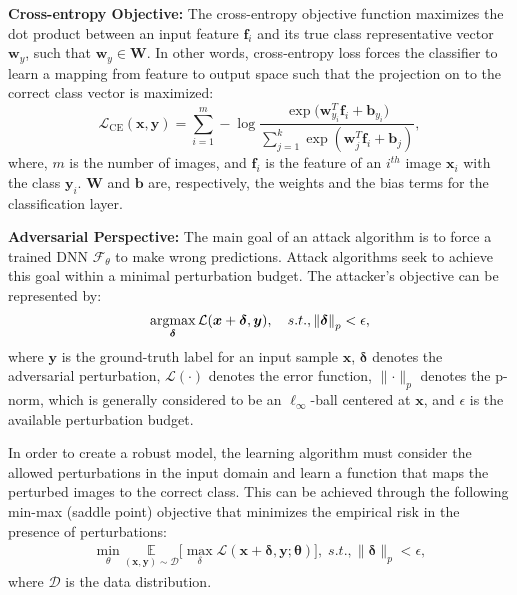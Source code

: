 \documentclass[10pt,twocolumn,letterpaper]{article}
\newcommand{\bx}{{\bm x}}
\newcommand{\bdelta}{{\bm \delta}}
\begin{document}
\noindent \textbf{Cross-entropy Objective:}  The cross-entropy objective function maximizes the dot product between an input feature $\bm{f}_i$ and its true class representative vector $\bm{w}_y$, such that $\bm{w}_y \in \bm{W}$. In other words, cross-entropy loss forces the classifier to learn a mapping from feature to output space such that the projection on to the correct class vector is maximized:\vspace{-0.55em}
\begin{equation}
\label{eq:2}
\mathcal{L}_{\text{CE}}(\bm{x}, \bm{y})= \sum_{i=1}^m - \log\frac{\exp({\bm{w}^T_{y_i}\bm{f}_i + \bm{b}_{y_i}) }}{\sum_{j=1}^k \exp({\bm{w}^T_{j}\bm{f}_i + \bm{b}_{j}}) },
\end{equation}
where, $m$ is the number of images, and $\bm{f}_i$ is the feature of an $i^{th}$ image $\bm{x}_i$ with the class $\bm{y}_i$. $\bm{W}$ and $\bm{b}$ are, respectively, the weights and the bias terms for the classification layer.

\noindent \textbf{Adversarial Perspective:} The main goal of an attack algorithm is to force a trained DNN $\mathcal{F}_\theta$ to make wrong predictions. Attack algorithms seek to achieve this goal within a minimal perturbation budget. The attacker's objective can be represented by:\vspace{-0.55em}
\begin{equation}
    \label{eq:adv_loss}
    \underset{\bdelta}{\text{argmax}}\, \mathcal{L}(\bx + \bdelta,\bm{y}), \quad s.t., {\parallel}\bdelta{\parallel}_p < \epsilon,
    \vspace{-0.5em}
\end{equation}
where $\bm{y}$ is the ground-truth label for an input sample $\bx$,  $\bdelta$ denotes the adversarial perturbation, $\mathcal{L}(\cdot)$ denotes the error function, $\parallel\cdot\parallel_p$ denotes the p-norm, which is generally considered to be an $\ell_{\infty}$-ball centered at $\bm{x}$, and $\epsilon$ is the available perturbation budget.

In order to create a robust model, the learning algorithm must consider the allowed perturbations in the input domain and learn a function that maps the perturbed images to the correct class. This can be achieved through the following min-max (saddle point) objective that minimizes the empirical risk in the presence of perturbations:
\begin{align}\label{eq:adv_training}
    \min_{\theta} \underset{(\bx,\bm{y}) \sim \mathcal{D}}{\mathbb{E}} \big[\max_{\delta} \mathcal{L}(\bm{x}+ \bdelta, \bm{y}; \bm{\theta})\big], \; s.t., {\parallel}\bdelta{\parallel}_p < \epsilon,
\end{align}
where $\mathcal{D}$ is the data distribution.
\end{document}
